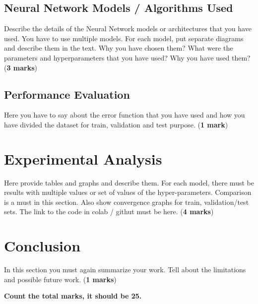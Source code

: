 \documentclass{article}
\begin{document}
\subsection{Neural Network Models / Algorithms Used}
Describe the details of the Neural Network models or architectures that you have used. You have to use multiple models. For each model, put separate diagrams and describe them in the text. Why you have chosen them? What were the parameters and hyperparameters that you have used? Why you have used them? (\textbf{3 marks})

\subsection{Performance Evaluation}
Here you have to say about the error function that you have used and how you have divided the dataset for train, validation and test purpose. (\textbf{1 mark})

\section{Experimental Analysis}
Here provide tables and graphs and describe them. For each model, there must be results with multiple values or set of values of the hyper-parameters. Comparison is a must in this section. Also show convergence graphs for train, validation/test sets. The link to the code in colab / githut must be here. 
(\textbf{4 marks})
\section{Conclusion}
In this section you must again summarize your work. Tell about the limitations and possible future work. (\textbf{1 marks})

\noindent
\textbf{Count the total marks, it should be 25.}



\end{document}
